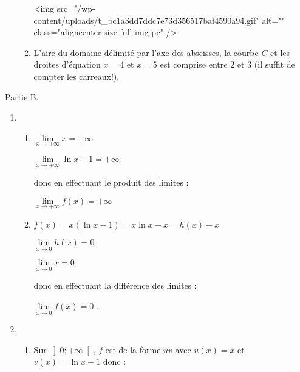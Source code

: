 \begin{corrige}
\begin{enumerate}
\begin{enumerate}
\begin{center}
\begin{extern}
{
      }
   \end{extern}
\end{center}
<img src="/wp-content/uploads/t_bc1a3dd7ddc7e73d356517baf4590a94.gif" alt="" class="aligncenter size-full  img-pc" />
               \item
               L'aire du domaine délimité par l'axe des abscisses, la courbe $C$ et les droites d'équation $x=4$ et $x=5$ est comprise entre 2 et 3 (il suffit de compter les carreaux!).
          \end{enumerate}
     \end{enumerate}
     \begin{h3}Partie B.\end{h3}
     \begin{enumerate}
          \item
          \begin{enumerate}[label=\alph*.]
               \item
               $\lim\limits_{x\rightarrow +\infty }x=+\infty $
               \par
               $\lim\limits_{x\rightarrow +\infty }\ln x-1=+\infty $
               \par
               donc en effectuant le produit des limites :
               \par
               $\lim\limits_{x\rightarrow +\infty }f\left(x\right)=+\infty $
               \item
               $f\left(x\right)=x\left(\ln x-1\right)=x\ln x-x=h\left(x\right)-x$
               \par
               $\lim\limits_{x\rightarrow 0}h\left(x\right)=0$
               \par
               $\lim\limits_{x\rightarrow 0}x=0$
               \par
               donc en effectuant la différence des limites :
               \par
               $\lim\limits_{x\rightarrow 0}f\left(x\right)=0$
               .
          \end{enumerate}
          \item
          \begin{enumerate}[label=\alph*.]
               \item
               Sur $\left]0; +\infty \right[$, $f$ est de la forme $uv$ avec $u\left(x\right)=x$ et $v\left(x\right)=\ln x-1$ donc :

\end{enumerate}
\end{enumerate}
\end{corrige}
